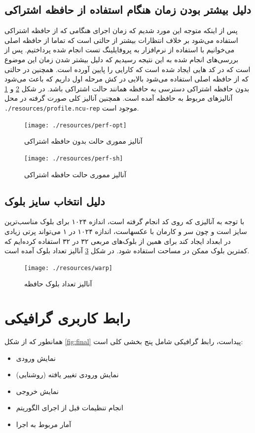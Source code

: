 \documentclass{article}
\begin{document}
\subsection{دلیل بیشتر بودن زمان هنگام استفاده از حافظه اشتراکی}
پس از اینکه متوجه این مورد شدیم که زمان اجرای هنگامی که از حافظه اشتراکی 
استفاده می‌شود بر خلاف انتظارات بیشتر از حالتی است که تماما از حافظه اصلی
می‌خوانیم با استفاده از نرم‌افزار  به پروفایلینگ
تست انجام شده پرداختیم. پس از بررسی‌های انجام شده به این نتیجه رسیدیم که دلیل بیشتر شدن زمان این موضوع است که در کد ‌هایی ایجاد شده است که
کارایی را پایین آورده است. همچنین در حالتی که از حافظه اصلی استفاده می‌شود
 بالایی در کش مرحله اول داریم که باعث می‌شود بدون حافظه اشتراکی
دسترسی به حافظه همانند حالت اشتراکی باشد. در شکل \ref{fig:perf:sh}
و \ref{fig:perf:opt} آنالیزهای مربوط به حافظه آمده است. همچنین آنالیز کلی
صورت گرفته در محل
\verb!./resources/profile.ncu-rep!
موجود است.

\begin{figure}
	\centering
	\texttt{[image: ./resources/perf-opt]}
	\caption{آنالیز مموری حالت بدون حافظه اشتراکی}
	\label{fig:perf:opt}
\end{figure}


\begin{figure}
	\centering
	\texttt{[image: ./resources/perf-sh]}
	\caption{آنالیز مموری حالت حافظه اشتراکی}
	\label{fig:perf:sh}
\end{figure}


\subsection{دلیل انتخاب سایز بلوک}
با توجه به آنالیزی که روی کد انجام گرفته است، اندازه ۱۰۲۴ برای بلوک مناسب‌ترین
سایز است و چون سر و کارمان با عکسهاست، اندازه ۱۰۲۴ در ۱ می‌تواند پرتی زیادی در ابعداد ایجاد کند برای همین از بلوک‌های مربعی ۳۲ در ۳۲ استفاده کرده‌ایم که کمترین‌ بلوک ممکن در مساحت استفاده شود. در شکل \ref{fig:block} آنالیز تعداد بلوک آمده است.

\begin{figure}
\centering
\texttt{[image: ./resources/warp]}
\caption{آنالیز تعداد بلوک حافظه}
\label{fig:block}
\end{figure}

\section{رابط کاربری گرافیکی}
همانطور که از شکل \ref{fig:final} پیداست، رابط گرافیکی شامل پنج بخشی کلی است:
\begin{itemize}
	\item نمایش ورودی
	
	\item نمایش ورودی تغییر یافته (روشنایی)
	
	\item نمایش خروجی
	
	\item انجام تنظیمات قبل از اجرای الگوریتم
	
	\item آمار مربوط به اجرا
\end{itemize}
\end{document}
